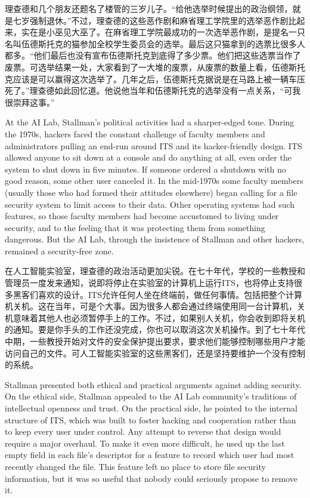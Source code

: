 \ifdefined\chs
理查德和几个朋友还题名了楼管的三岁儿子。“给他选举时候提出的政治纲领，就是七岁强制退休。”不过，理查德的这些恶作剧和麻省理工学院里的选举恶作剧比起来，实在是小巫见大巫了。在麻省理工学院最成功的一次选举恶作剧，是提名一只名叫伍德斯托克的猫参加全校学生委员会的选举。最后这只猫拿到的选票比很多人都多。“他们最后也没有宣布伍德斯托克到底得了多少票。他们把这些选票当作了废票。可选举结果一处，大家看到了一大堆的废票，从废票的数量上看，伍德斯托克应该是可以赢得这次选举了。几年之后，伍德斯托克据说是在马路上被一辆车压死了。”理查德如此回忆道。他说他当年和伍德斯托克的选举没有一点关系，“可我很崇拜这事。”
\fi

\ifdefined\eng
At the AI Lab, Stallman's political activities had a sharper-edged tone. During the 1970s, hackers faced the constant challenge of faculty members and administrators pulling an end-run around ITS and its hacker-friendly design. ITS allowed anyone to sit down at a console and do anything at all, even order the system to shut down in five minutes. If someone ordered a shutdown with no good reason, some other user canceled it. In the mid-1970s some faculty members (usually those who had formed their attitudes elsewhere) began calling for a file security system to limit access to their data.   Other operating systems had such features, so those faculty members had become accustomed to living under security, and to the feeling that it was protecting them from something dangerous. But the AI Lab, through the insistence of Stallman and other hackers, remained a security-free zone.
\fi

\ifdefined\chs
在人工智能实验室，理查德的政治活动更加尖锐。在七十年代，学校的一些教授和管理员一度发来通知，说即将停止在实验室的计算机上运行ITS，也将停止支持很多黑客们喜欢的设计。ITS允许任何人坐在终端前，做任何事情。包括把整个计算机关机。这在当年，可是个大事。因为很多人都会通过终端使用同一台计算机，关机意味着其他人也必须暂停手上的工作。不过，如果别人关机，你会收到即将关机的通知。要是你手头的工作还没完成，你也可以取消这次关机操作。到了七十年代中期，一些教授开始对文件的安全保护提出要求，要求他们能够控制哪些用户才能访问自己的文件。可人工智能实验室的这些黑客们，还是坚持要维护一个没有控制的系统。
\fi

\ifdefined\eng
Stallman presented both ethical and practical arguments against adding security. On the ethical side, Stallman appealed to the AI Lab community's traditions of intellectual openness and trust. On the practical side, he pointed to the internal structure of ITS, which was built to foster hacking and cooperation rather than to keep every user under control.  Any attempt to reverse that design would require a major overhaul. To make it even more difficult, he used up the last empty field in each file's descriptor for a feature to record which user had most recently changed the file. This feature left no place to store file security information, but it was so useful that nobody could seriously propose to remove it.
\fi

